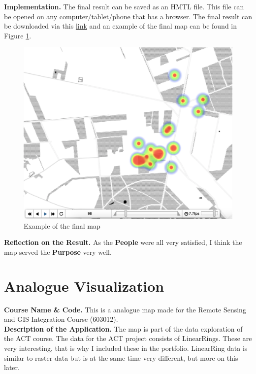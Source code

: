 \documentclass{article}
\begin{document}
\noindent
\textbf{Implementation.}
The final result can be saved as an HMTL file. This file can be opened on any computer/tablet/phone that has a browser.
The final result can be downloaded via this \href{https://github.com/RobertvdV/GRS60312_RemoteSensingAndGISIntergration_IDV_Portfolio/blob/master/data/processed/HeathMapPerDag.html}{link} and an example of the final map can be found in Figure \ref{fig:finalmap}.
\\
\begin{figure}[ht]
    \centering
    \includegraphics[width=\textwidth, height=\textheight, keepaspectratio]{finalmap.png}
    \caption{Example of the final map}
    \label{fig:finalmap}
\end{figure}

\noindent
\textbf{Reflection on the Result.}
As the \textbf{People} were all very satisfied, I think the map served the \textbf{Purpose} very well. 

\newpage
\section{Analogue Visualization}
\textbf{Course Name \& Code.}
This is a analogue map made for the Remote Sensing and GIS Integration Course (603012).
\\

\noindent
\textbf{Description of the Application.}
The map is part of the data exploration of the ACT course. 
The data for the ACT project consists of LinearRings. 
These are very interesting, that is why I included these in the portfolio.
LinearRing data is similar to raster data but is at the same time very different, but more on this later.
\\
\end{document}
